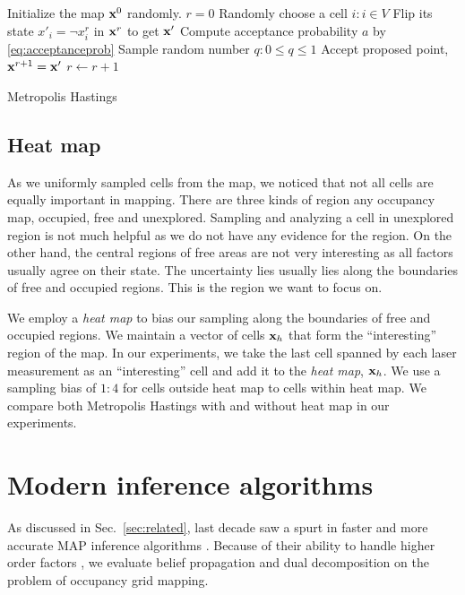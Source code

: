 \documentclass[letterpaper, 10 pt, conference]{ieeeconf} %
\begin{document}
% 
\begin{algorithm}
  Initialize the map $\mathbf{x}^0$ randomly.\;
  $r = 0$\;
   {
    Randomly choose a cell $i : i \in V$\;
    Flip its state $x'_i = \neg x^r_i$ in $\mathbf{x}^r$ to get $\mathbf{x}'$\;
    Compute acceptance probability $a$ by \eqref{eq:acceptanceprob}\;
    Sample random number $q : 0 \le q \le 1$\;
     {
      Accept proposed point, $\mathbf{x}^{r + 1} = \mathbf{x}'$\;
    } 
    $r \leftarrow r + 1$\;
  }
  \caption{Metropolis Hastings}
  \label{alg:metropolis}
\end{algorithm}

\subsection{Heat map}
As we uniformly sampled cells from the map, we noticed that not all
cells are equally important in mapping. There are three kinds of region any
occupancy map, occupied, free and unexplored. Sampling and analyzing a cell in
unexplored region is not much helpful as we do not have any evidence for the
region. On the other hand, the central regions of free areas are not very
interesting as all factors usually agree on their state. The uncertainty lies
usually lies along the boundaries of free and occupied regions. This is the
region we want to focus on.

We employ a \emph{heat map} to bias our sampling along the boundaries of free
and occupied regions. We maintain a vector of cells $\mathbf{x}_h$ that form the
``interesting'' region of the map. In our experiments, we take the last cell
spanned by each laser measurement as an ``interesting'' cell and add it to the
\emph{heat map}, $\mathbf{x}_h$. We use a sampling bias of $1:4$ for cells
outside heat map to cells within heat map. We compare both Metropolis Hastings
with and without heat map in our experiments.

\section{Modern inference algorithms}
As discussed in Sec.~\ref{sec:related}, last decade saw a spurt in faster and
more accurate MAP inference algorithms \cite{kappes2013comparative}. Because of
their ability to handle higher order factors
\cite{potetz2007efficient,komodakis2009beyond}, we evaluate belief propagation
and dual decomposition on the problem of occupancy grid mapping.
\end{document}
